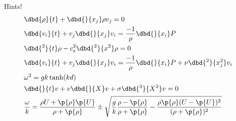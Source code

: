 Hints!
\begin{align}
&\dbd{\rho}{t}+\dbd{ }{x_j} \rho v_j = 0\\
&\dbd{v_i}{t} + v_j \dbd{ }{x_j} v_i = \frac{-1}{\rho}\dbd{ }{x_i} P\\
&\dbd{^2}{t}\rho -c_s^2 \dbd{^2 }{x^2} \rho = 0\\
&\dbd{v_i}{t} + v_j \dbd{ }{x_j} v_i = \frac{-1}{\rho}\dbd{ }{x_i} P + \nu \dbd{^2 }{x_j^2} v_i\\
&\omega^2 = g k \tanh(k d)\\
&\dbd{ }{t} v + v \dbd{ }{X} v + \sigma \dbd{^3}{X^3} v = 0\\
&\frac{\omega}{k} = \frac{ \rho U + \p{\rho}\p{U}}{\rho+\p{\rho}} \pm \sqrt{\frac{g}{k}\frac{\rho-\p{\rho}}{\rho+\p{\rho}}-\frac{ \rho\p{\rho}(U-\p{U})^2}{(\rho+\p{\rho})^2}} \end{align}

